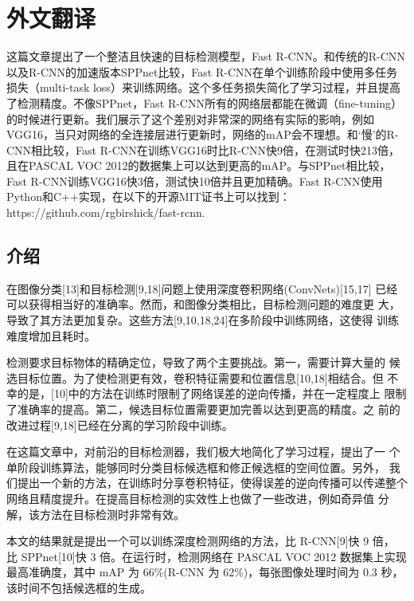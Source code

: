 \cleardoublepage
\chapter{外文翻译}

\par 这篇文章提出了一个整洁且快速的目标检测模型，Fast R-CNN。和传统的R-CNN以及R-CNN的加速版本SPPnet比较，Fast R-CNN在单个训练阶段中使用多任务损失（multi-task loss）来训练网络。这个多任务损失简化了学习过程，并且提高了检测精度。不像SPPnet，Fast R-CNN所有的网络层都能在微调（fine-tuning）的时候进行更新。我们展示了这个差别对非常深的网络有实际的影响，例如VGG16，当只对网络的全连接层进行更新时，网络的mAP会不理想。和‘慢’的R-CNN相比较，Fast R-CNN在训练VGG16时比R-CNN快9倍，在测试时快213倍，且在PASCAL VOC 2012的数据集上可以达到更高的mAP。与SPPnet相比较，Fast R-CNN训练VGG16快3倍，测试快10倍并且更加精确。Fast R-CNN使用Python和C++实现，在以下的开源MIT证书上可以找到：https://github.com/rgbirshick/fast-rcnn.

\section{介绍}
\par 在图像分类[13]和目标检测[9,18]问题上使用深度卷积网络(ConvNets)[15,17] 已经可以获得相当好的准确率。然而，和图像分类相比，目标检测问题的难度更 大，导致了其方法更加复杂。这些方法[9,10,18,24]在多阶段中训练网络，这使得 训练难度增加且耗时。
\par 检测要求目标物体的精确定位，导致了两个主要挑战。第一，需要计算大量的 候选目标位置。为了使检测更有效，卷积特征需要和位置信息[10,18]相结合。但 不幸的是，[10]中的方法在训练时限制了网络误差的逆向传播，并在一定程度上 限制了准确率的提高。第二，候选目标位置需要更加完善以达到更高的精度。之 前的改进过程[9,18]已经在分离的学习阶段中训练。
\par 在这篇文章中，对前沿的目标检测器，我们极大地简化了学习过程，提出了一 个单阶段训练算法，能够同时分类目标候选框和修正候选框的空间位置。另外， 我们提出一个新的方法，在训练时分享卷积特征，使得误差的逆向传播可以传递整个网络且精度提升。在提高目标检测的实效性上也做了一些改进，例如奇异值 分解，该方法在目标检测时非常有效。
\par 本文的结果就是提出一个可以训练深度检测网络的方法，比 R-CNN[9]快 9 倍， 比 SPPnet[10]快 3 倍。在运行时，检测网络在 PASCAL VOC 2012 数据集上实现 最高准确度，其中 mAP 为 66\%(R-CNN 为 62\%)，每张图像处理时间为 0.3 秒， 该时间不包括候选框的生成。

